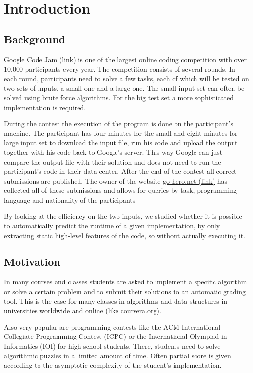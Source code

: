 \section{Introduction}
\subsection*{Background}
\href{https://code.google.com/codejam}{Google Code Jam (link)} is one of the largest online coding competition with over 10,000 participants every year. The competition consists of several rounds. In each round, participants need to solve a few tasks, each of which will be tested on two sets of inputs, a small one and a large one. The small input set can often be solved using brute force algorithms. For the big test set a more sophisticated implementation is required.

During the contest the execution of the program is done on the participant's machine. The participant has four minutes for the small and eight minutes for large input set to download the input file, run his code and upload the output together with his code back to Google's server. This way Google can just compare the output file with their solution and does not need to run the participant's code in their data center.
After the end of the contest all correct submissions are published.
The owner of the website \href{http://www.go-hero.net/jam/13}{go-hero.net (link)} has collected all of these submissions and allows for queries by task, programming language and nationality of the participants.

By looking at the efficiency on the two inputs, we studied whether it is possible to automatically predict the runtime of a given implementation, by only extracting static high-level features of the code, so without actually executing it.

\subsection*{Motivation}
In many courses and classes students are asked to implement a specific algorithm or solve a certain problem and to submit their solutions to an automatic grading tool. This is the case for many classes in algorithms and data structures in universities worldwide and online (like coursera.org).

Also very popular are programming contests like the ACM International Collegiate Programming Contest (ICPC) or the International Olympiad in Informatics (IOI) for high school students. There, students need to solve algorithmic puzzles in a limited amount of time. Often partial score is given according to the asymptotic complexity of the student’s implementation.


